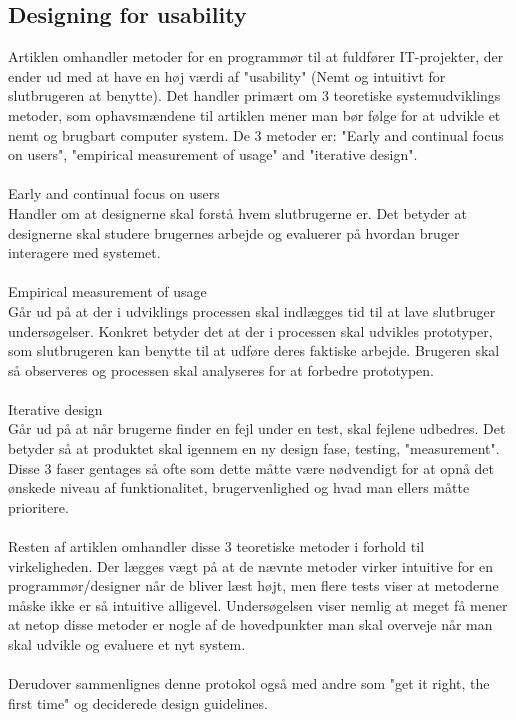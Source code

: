 \documentclass[12pt]{article}
\begin{document}
\subsection{Designing for usability}
Artiklen omhandler metoder for en programmør til at fuldfører IT-projekter, der ender ud med at have en høj værdi af "usability" (Nemt og intuitivt for slutbrugeren at benytte). Det handler primært om 3 teoretiske systemudviklings metoder, som ophavsmændene til artiklen mener man bør følge for at udvikle et nemt og brugbart computer system. De 3 metoder er: "Early and continual focus on users", "empirical measurement of usage" and "iterative design". \\\\
Early and continual focus on users\\
Handler om at designerne skal forstå hvem slutbrugerne er. Det betyder at designerne skal studere brugernes arbejde og evaluerer på hvordan bruger interagere med systemet.\\\\
Empirical measurement of usage\\
Går ud på at der i udviklings processen skal indlægges tid til at lave slutbruger undersøgelser. Konkret betyder det at der i processen skal udvikles prototyper, som slutbrugeren kan benytte til at udføre deres faktiske arbejde. Brugeren skal så observeres og processen skal analyseres for at forbedre prototypen.\\\\
Iterative design\\
Går ud på at når brugerne finder en fejl under en test, skal fejlene udbedres. Det betyder så at produktet skal igennem en ny design fase, testing, "measurement". Disse 3 faser gentages så ofte som dette måtte være nødvendigt for at opnå det ønskede niveau af funktionalitet, brugervenlighed og hvad man ellers måtte prioritere.
\\\\
Resten af artiklen omhandler disse 3 teoretiske metoder i forhold til virkeligheden. Der lægges vægt på at de nævnte metoder virker intuitive for en programmør/designer når de bliver læst højt, men flere tests viser at metoderne måske ikke er så intuitive alligevel. Undersøgelsen viser nemlig at meget få mener at netop disse metoder er nogle af de hovedpunkter man skal overveje når man skal udvikle og evaluere et nyt system. \\\\Derudover sammenlignes denne protokol også med andre som "get it right, the first time" og deciderede design guidelines. \\\\
\end{document}
